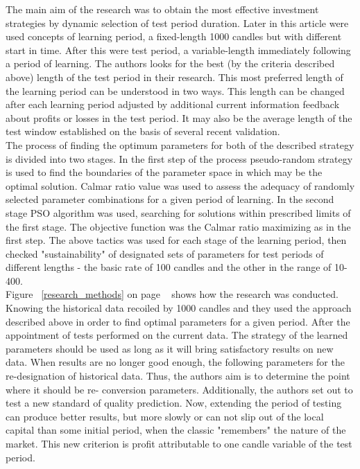 \documentclass{tewiart}
\begin{document}
The main aim of the research was to obtain the most effective investment strategies by dynamic selection of test period duration. Later in this article were used concepts of learning period, a fixed-length 1000 candles but with different start in time. After this were test period, a variable-length immediately following a period of learning. The authors looks for the best (by the criteria described above) length of the test period in their research. This most preferred length of the learning period can be understood in two ways. This length can be changed after each learning period adjusted by additional current information feedback about profits or losses in the test period. It may also be the average length of the test window established on the basis of several recent validation.\\

The process of finding the optimum parameters for both of the described strategy is divided into two stages. In the first step of the process pseudo-random strategy is used to find the boundaries of the parameter space in which may be the optimal solution. Calmar ratio value was used to assess the adequacy of randomly selected parameter combinations for a given period of learning. In the second stage PSO \cite{Kennedy}  algorithm was used, searching for solutions within prescribed limits of the first stage. The objective function was the Calmar ratio maximizing as in the first step. The above tactics was used for each stage of the learning period, then checked "sustainability" of designated sets of parameters for test periods of different lengths - the basic rate of 100 candles and the other in the range of 10-400.\\

Figure ~\ref{research_methods} on page ~\pageref{research_methods} shows how the research was conducted. Knowing the historical data recoiled by 1000 candles and they used the approach described above in order to find optimal parameters for a given period. After the appointment of tests performed on the current data. The strategy of the learned parameters should be used as long as it will bring satisfactory results on new data. When results are no longer good enough, the following parameters for the re-designation of historical data. Thus, the authors aim is to determine the point where it should be re- conversion parameters. Additionally, the authors set out to test a new standard of quality prediction. Now, extending the period of testing can produce better results, but more slowly or can not slip out of the local capital than some initial period, when the classic "remembers" the nature of the market. This new criterion is profit attributable to one candle variable of the test period.\\
\end{document}
